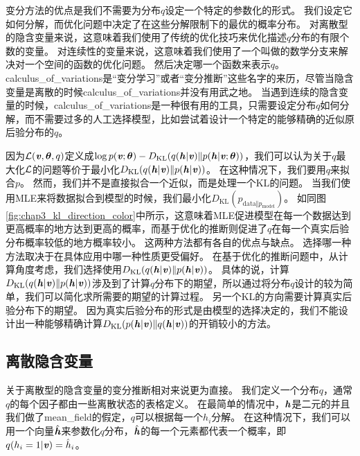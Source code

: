 变分方法的优点是我们不需要为分布$q$设定一个特定的参数化的形式。
我们设定它如何分解，而优化问题中决定了在这些分解限制下的最优的概率分布。
对离散型的隐含变量来说，这意味着我们使用了传统的优化技巧来优化描述$q$分布的有限个数的变量。
对连续性的变量来说，这意味着我们使用了一个叫做的数学分支来解决对一个空间的函数的优化问题。
然后决定哪一个函数来表示$q$。
\gls{calculus_of_variations}是``变分学习''或者``变分推断''这些名字的来历，尽管当隐含变量是离散的时候\gls{calculus_of_variations}并没有用武之地。
当遇到连续的隐含变量的时候，\gls{calculus_of_variations}是一种很有用的工具，只需要设定分布$q$如何分解，而不需要过多的人工选择模型，比如尝试着设计一个特定的能够精确的近似原后验分布的$q$。


因为$\mathcal{L}(\boldsymbol{\mathit{v}},\boldsymbol{\theta},q)$定义成$\log p(\boldsymbol{\mathit{v}};\boldsymbol{\theta}) - D_{\text{KL}}(q(\boldsymbol{\mathit{h}}\vert\boldsymbol{\mathit{v}})\Vert p(\boldsymbol{\mathit{h}}\vert\boldsymbol{\mathit{v}};\boldsymbol{\theta}))$，我们可以认为关于$q$最大化$\mathcal{L}$的问题等价于最小化$D_{\text{KL}}(q(\boldsymbol{\mathit{h}}\vert\boldsymbol{\mathit{v}})\Vert p(\boldsymbol{\mathit{h}}\vert\boldsymbol{\mathit{v}}))$。
在这种情况下，我们要用$q$来拟合$p$。
然而，我们并不是直接拟合一个近似，而是处理一个\gls{KL}的问题。
当我们使用\gls{MLE}来将数据拟合到模型的时候，我们最小化$D_{\text{KL}}(p_{\text{data}\Vert p_{\text{model}}})$。
如同图\ref{fig:chap3_kl_direction_color}中所示，这意味着\gls{MLE}促进模型在每一个数据达到更高概率的地方达到更高的概率，而基于优化的推断则促进了$q$在每一个真实后验分布概率较低的地方概率较小。
这两种方法都有各自的优点与缺点。
选择哪一种方法取决于在具体应用中哪一种性质更受偏好。
在基于优化的推断问题中，从计算角度考虑，我们选择使用$D_{\text{KL}}(q(\boldsymbol{\mathit{h}}\vert\boldsymbol{\mathit{v}})\Vert p(\boldsymbol{\mathit{h}}\vert\boldsymbol{\mathit{v}}))$。
具体的说，计算$D_{\text{KL}}(q(\boldsymbol{\mathit{h}}\vert\boldsymbol{\mathit{v}})\Vert p(\boldsymbol{\mathit{h}}\vert\boldsymbol{\mathit{v}}))$涉及到了计算$q$分布下的期望，所以通过将分布$q$设计的较为简单，我们可以简化求所需要的期望的计算过程。
另一个\gls{KL}的方向需要计算真实后验分布下的期望。
因为真实后验分布的形式是由模型的选择决定的，我们不能设计出一种能够精确计算$D_{\text{KL}}(p(\boldsymbol{\mathit{h}}\vert\boldsymbol{\mathit{v}}) \Vert q(\boldsymbol{\mathit{h}}\vert\boldsymbol{\mathit{v}}))$的开销较小的方法。




\subsection{离散隐含变量}
\label{sec:discrete_latent_variables}

关于离散型的隐含变量的变分推断相对来说更为直接。
我们定义一个分布$q$，通常$q$的每个因子都由一些离散状态的表格定义。
在最简单的情况中，$\boldsymbol{\mathit{h}}$是二元的并且我们做了\gls{mean_field}的假定，$q$可以根据每一个$h_i$分解。
在这种情况下，我们可以用一个向量$\hat{\boldsymbol{\mathit{h}}}$来参数化$q$分布，$\hat{\boldsymbol{\mathit{h}}}$的每一个元素都代表一个概率，即$q(h_i = 1\vert \boldsymbol{\mathit{v}}) = \hat{h}_i$。


